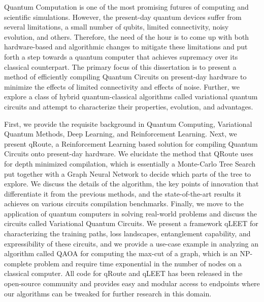 Quantum Computation is one of the most promising futures of computing and scientific simulations. However, the present-day quantum devices suffer from several limitations, a small number of qubits, limited connectivity, noisy evolution, and others. Therefore, the need of the hour is to come up with both hardware-based and algorithmic changes to mitigate these limitations and put forth a step towards a quantum computer that achieves supremacy over its classical counterpart. The primary focus of this dissertation is to present a method of efficiently compiling Quantum Circuits on present-day hardware to minimize the effects of limited connectivity and effects of noise. Further, we explore a class of hybrid quantum-classical algorithms called variational quantum circuits and attempt to characterize their properties, evolution, and advantages. 

First, we provide the requisite background in Quantum Computing, Variational Quantum Methods, Deep Learning, and Reinforcement Learning. Next, we present qRoute, a Reinforcement Learning based solution for compiling Quantum Circuits onto present-day hardware. We elucidate the method that QRoute uses for depth minimized compilation, which is essentially a Monte-Carlo Tree Search put together with a Graph Neural Network to decide which parts of the tree to explore. We discuss the details of the algorithm, the key points of innovation that differentiate it from the previous methods, and the state-of-the-art results it achieves on various circuits compilation benchmarks. Finally, we move to the application of quantum computers in solving real-world problems and discuss the circuits called Variational Quantum Circuits. We present a framework qLEET for characterizing the training paths, loss landscapes, entanglement capability, and expressibility of these circuits, and we provide a use-case example in analyzing an algorithm called QAOA for computing the max-cut of a graph, which is an NP-complete problem and require time exponential in the number of nodes on a classical computer. All code for qRoute and qLEET has been released in the open-source community and provides easy and modular access to endpoints where our algorithms can be tweaked for further research in this domain.
